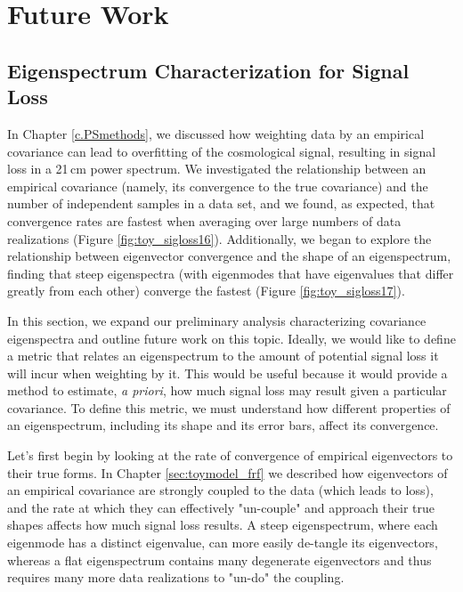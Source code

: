 \chapter{Future Work}
\label{c.future}

\section{Eigenspectrum Characterization for Signal Loss}

In Chapter \ref{c.PSmethods}, we discussed how weighting data by an empirical covariance can lead to overfitting of the cosmological signal, resulting in signal loss in a 21\,cm power spectrum. We investigated the relationship between an empirical covariance (namely, its convergence to the true covariance) and the number of independent samples in a data set, and we found, as expected, that convergence rates are fastest when averaging over large numbers of data realizations (Figure \ref{fig:toy_sigloss16}). Additionally, we began to explore the relationship between eigenvector convergence and the shape of an eigenspectrum, finding that steep eigenspectra (with eigenmodes that have eigenvalues that differ greatly from each other) converge the fastest (Figure \ref{fig:toy_sigloss17}).

In this section, we expand our preliminary analysis characterizing covariance eigenspectra and outline future work on this topic. Ideally, we would like to define a metric that relates an eigenspectrum to the amount of potential signal loss it will incur when weighting by it. This would be useful because it would provide a method to estimate, \textit{a priori}, how much signal loss may result given a particular covariance. To define this metric, we must understand how different properties of an eigenspectrum, including its shape and its error bars, affect its convergence. 

Let's first begin by looking at the rate of convergence of empirical eigenvectors to their true forms. In Chapter \ref{sec:toymodel_frf} we described how eigenvectors of an empirical covariance are strongly coupled to the data (which leads to loss), and the rate at which they can effectively "un-couple" and approach their true shapes affects how much signal loss results. A steep eigenspectrum, where each eigenmode has a distinct eigenvalue, can more easily de-tangle its eigenvectors, whereas a flat eigenspectrum contains many degenerate eigenvectors and thus requires many more data realizations to "un-do" the coupling. 

